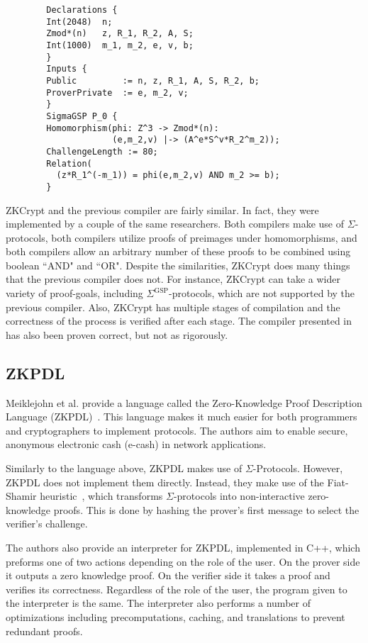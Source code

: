\documentclass{sig-alternate}
\begin{document}
		\begin{verbatim}
		Declarations {
		Int(2048)  n;
		Zmod*(n)   z, R_1, R_2, A, S;
		Int(1000)  m_1, m_2, e, v, b;
		}
		Inputs {
		Public         := n, z, R_1, A, S, R_2, b;
		ProverPrivate  := e, m_2, v;
		}
		SigmaGSP P_0 {
		Homomorphism(phi: Z^3 -> Zmod*(n):
					 (e,m_2,v) |-> (A^e*S^v*R_2^m_2));
		ChallengeLength := 80;
		Relation(
		  (z*R_1^(-m_1)) = phi(e,m_2,v) AND m_2 >= b);
		}
		\end{verbatim}
		
		ZKCrypt and the previous compiler are fairly similar. In fact, they were implemented
		by a couple of the same researchers. Both compilers make use of $\Sigma$-protocols, both
		compilers utilize proofs of preimages under homomorphisms, and both compilers allow
		an arbitrary number of these proofs to be combined using boolean ``AND" and ``OR".
		Despite the similarities, ZKCrypt does many things that the previous compiler does
		not. For instance, ZKCrypt can take a wider variety of proof-goals, including
		$\Sigma^{\textrm{GSP}}$-protocols, which are not supported by the previous compiler.
		Also, ZKCrypt has multiple stages of compilation and the correctness
		of the process is verified after each stage. The compiler presented in~\cite{Sigma:2009}
		has also been proven correct, but not as rigorously.
				
	\subsection{ZKPDL}
		Meiklejohn et al. provide a language called the Zero-Knowledge Proof Description
		Language (ZKPDL)~\cite{ZKPDL:2010}. This language makes it much easier for both
		programmers and cryptographers to implement protocols. The authors aim to enable
		secure, anonymous electronic cash (e-cash) in network applications.
		
		Similarly to the language above, ZKPDL makes use of $\Sigma$-Protocols.
		However, ZKPDL does not implement them directly. Instead, they make use of the 
		Fiat-Shamir heuristic~\cite{Fiat-Shamir}, which transforms $\Sigma$-protocols 
		into non-interactive zero-knowledge proofs. This is done by hashing the prover's
		first message to select the verifier's challenge.
		
		The authors also provide an interpreter for ZKPDL, implemented in C++, which
		preforms one of two actions depending on the role of the user. On the prover
		side it outputs a zero knowledge proof. On the verifier side it takes a proof
		and verifies its correctness. Regardless of the role of the user, the program
		given to the interpreter is the same. The interpreter also performs a number of
		optimizations including precomputations, caching, and translations to prevent
		redundant proofs. 
\end{document}
